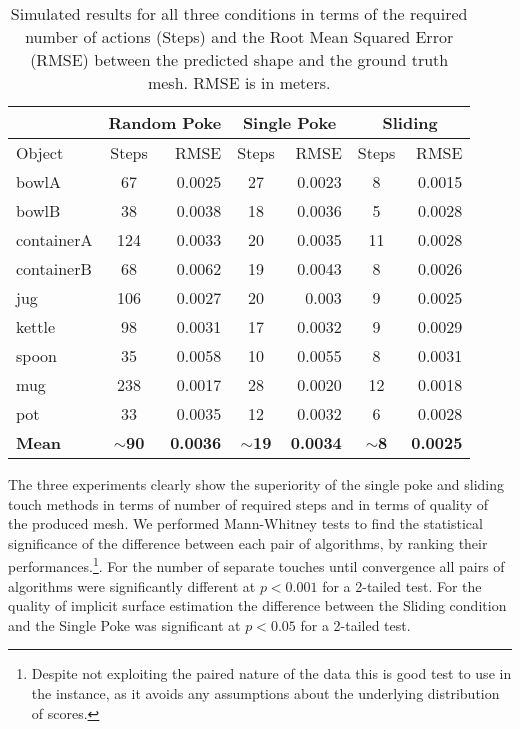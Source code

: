 \begin{table}
    \centering
    \begin{tabular}{|l|c|r|c|r|c|r|} \hline
        & \multicolumn{2}{|c|}{Random Poke} & \multicolumn{2}{c|}{Single Poke} & \multicolumn{2}{c|}{Sliding}\\
        \hline
        Object & Steps & RMSE & Steps & RMSE & Steps & RMSE\\
        \hline
        bowlA & 67 & 0.0025 & 27 & 0.0023 &8 & 0.0015\\
        bowlB & 38 & 0.0038 &18 & 0.0036 & 5 & 0.0028\\
        containerA & 124 & 0.0033 & 20 & 0.0035 & 11 & 0.0028\\
        containerB & 68 & 0.0062 & 19 & 0.0043 & 8 & 0.0026\\
        jug & 106 & 0.0027 & 20 & 0.003 & 9 & 0.0025\\
        kettle & 98 & 0.0031 & 17 & 0.0032 & 9 & 0.0029\\
        spoon & 35 & 0.0058 & 10 & 0.0055 & 8 & 0.0031\\
        mug & 238 & 0.0017 & 28 & 0.0020 & 12 & 0.0018\\
        pot & 33 & 0.0035 & 12 & 0.0032 & 6 & 0.0028\\
        \hline
        \textbf{Mean} & $\sim$\textbf{90} & \textbf{0.0036} & $\sim$\textbf{19} & \textbf{0.0034} & $\sim$\textbf{8} & \textbf{0.0025}\\
        \hline
    \end{tabular}
    \caption{Simulated results for all three conditions in terms of the required number of actions (Steps) and the Root Mean Squared Error (RMSE) between the predicted shape and the ground truth mesh. RMSE is in meters.}
    \label{tab:tests}
\end{table}

The three experiments clearly show the superiority of the single poke and sliding touch methods in terms of number of required steps
and in terms of quality of the produced mesh. We performed Mann-Whitney tests to find the statistical significance of the difference between each pair of algorithms, by ranking their performances.\footnote{Despite not exploiting the paired nature of the data this is good test to use in the instance, as it avoids any assumptions about the underlying distribution of scores.}. For the number of separate touches until convergence all pairs of algorithms were significantly different at $p<0.001$ for a 2-tailed test. For the quality of implicit surface estimation the difference between the Sliding condition and the Single Poke was significant at $p<0.05$ for a 2-tailed test.


